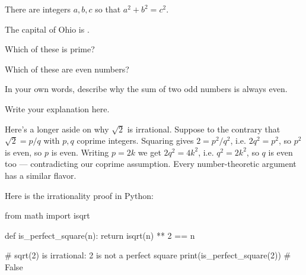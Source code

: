 \documentclass{ximera}
\begin{document}
\begin{theorem}
There are integers $a,b,c$ so that $a^2 + b^2 = c^2$.
\end{theorem}

\begin{problem}
  The capital of Ohio is .
\end{problem}

\begin{problem}
  Which of these is prime?
  \begin{multipleChoice}
  \end{multipleChoice}
\end{problem}

\begin{problem}
  Which of these are even numbers?
  \begin{selectAll}
  \end{selectAll}
\end{problem}

\begin{problem}
  In your own words, describe why the sum of two odd numbers is always even.
  \begin{freeResponse}
    Write your explanation here.
  \end{freeResponse}
\end{problem}

\begin{foldable}
  Here's a longer aside on why $\sqrt{2}$ is irrational. Suppose to the contrary that $\sqrt{2} = p/q$ with $p, q$ coprime integers. Squaring gives $2 = p^2 / q^2$, i.e. $2 q^2 = p^2$, so $p^2$ is even, so $p$ is even. Writing $p = 2k$ we get $2q^2 = 4k^2$, i.e. $q^2 = 2 k^2$, so $q$ is even too --- contradicting our coprime assumption. Every  number-theoretic argument has a similar flavor.
\end{foldable}


Here is the irrationality proof in Python:
\begin{python}
from math import isqrt

def is_perfect_square(n):
    return isqrt(n) ** 2 == n

# sqrt(2) is irrational: 2 is not a perfect square
print(is_perfect_square(2))  # False
\end{python}
\end{document}
